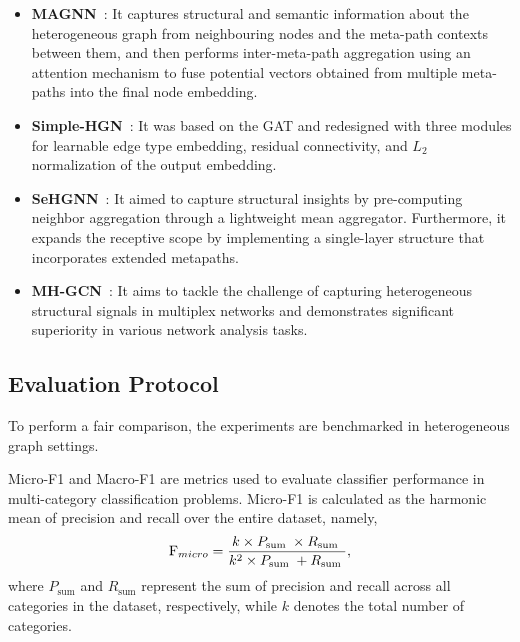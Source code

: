 \begin{itemize}[leftmargin=*]
    \item {\bf MAGNN}~\cite{fu2020magnn}: It captures structural and semantic information about the heterogeneous graph from neighbouring nodes and the meta-path contexts between them, and then performs inter-meta-path aggregation using an attention mechanism to fuse potential vectors obtained from multiple meta-paths into the final node embedding.

    \item {\bf Simple-HGN}~\cite{lv2021we}: It was based on the GAT and redesigned with three modules for learnable edge type embedding, residual connectivity, and $L_{2}$ normalization of the output embedding.

    \item {\bf SeHGNN}~\cite{yang2023simple}: It aimed to capture structural insights by pre-computing neighbor aggregation through a lightweight mean aggregator. Furthermore, it expands the receptive scope by implementing a single-layer structure that incorporates extended metapaths.

    \item {\bf MH-GCN}~\cite{li2022multi}: It aims to tackle the challenge of capturing heterogeneous structural signals in multiplex networks and demonstrates significant superiority in various network analysis tasks.

\end{itemize}


\subsection{Evaluation Protocol}
%
To perform a fair comparison, the experiments are benchmarked in heterogeneous graph settings.

Micro-F1 and Macro-F1 are metrics used to evaluate classifier performance in multi-category classification problems.
%
Micro-F1 is calculated as the harmonic mean of precision and recall over the entire dataset, namely, 
\begin{equation} \label{eq:micro}
    \textnormal{F}_{micro} =\frac{k \times P_{\text {sum }} \times R_{\text {sum }}}{k^2 \times P_{\text {sum }}+R_{\text {sum }}},
\end{equation}
where $P_{\text{sum}}$ and $R_{\text{sum}}$ represent the sum of precision and recall across all categories in the dataset, respectively, while $k$ denotes the total number of categories.


